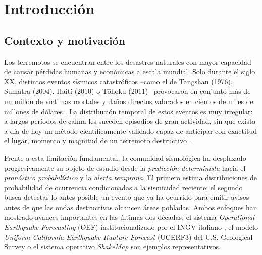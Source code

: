 
\cleardoublepage

\chapter{Introducción}
\label{introduccion}

\section{Contexto y motivación}
\label{contexto-motivacion}

Los terremotos se encuentran entre los desastres naturales con mayor capacidad de causar pérdidas humanas y económicas a escala mundial. Solo durante el siglo XX, distintos eventos sísmicos catastróficos --como el de Tangshan (1976), Sumatra (2004), Haití (2010) o Tōhoku (2011)-- provocaron en conjunto más de un millón de víctimas mortales y daños directos valorados en cientos de miles de millones de dólares \citep{un2015sendai}. La distribución temporal de estos eventos es muy irregular: a largos períodos de calma les suceden episodios de gran actividad, sin que exista a día de hoy un método científicamente validado capaz de anticipar con exactitud el lugar, momento y magnitud de un terremoto destructivo \citep{geller1997unpredictable, jordan2011oef}.

Frente a esta limitación fundamental, la comunidad sismológica ha desplazado progresivamente su objeto de estudio desde la \emph{predicción determinista} hacia el \emph{pronóstico probabilístico} y la \emph{alerta temprana}. El primero estima distribuciones de probabilidad de ocurrencia condicionadas a la sismicidad reciente; el segundo busca detectar lo antes posible un evento que ya ha ocurrido para emitir avisos antes de que las ondas destructivas alcancen áreas pobladas. Ambos enfoques han mostrado avances importantes en las últimas dos décadas: el sistema \textit{Operational Earthquake Forecasting} (OEF) institucionalizado por el INGV italiano \citep{marzocchi2014oef}, el modelo \textit{Uniform California Earthquake Rupture Forecast} (UCERF3) del U.S. Geological Survey \citep{field2014ucerf3, field2017ucerf3etas} o el sistema operativo \textit{ShakeMap} \citep{wald1999shakemap} son ejemplos representativos.

